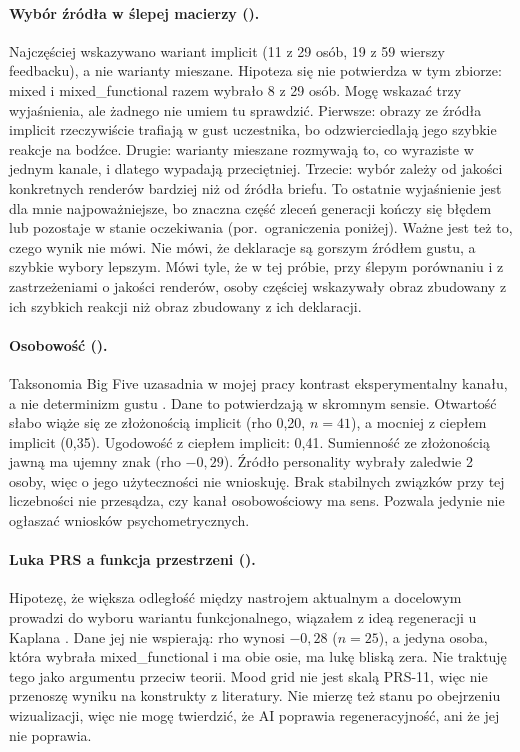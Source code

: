 \paragraph{Wybór źródła w ślepej macierzy ().}
Najczęściej wskazywano wariant implicit (11 z 29 osób, 19 z 59 wierszy feedbacku), a nie warianty mieszane. Hipoteza  się nie potwierdza w tym zbiorze: mixed i mixed\_functional razem wybrało 8 z 29 osób.
Mogę wskazać trzy wyjaśnienia, ale żadnego nie umiem tu sprawdzić. Pierwsze: obrazy ze źródła implicit rzeczywiście trafiają w gust uczestnika, bo odzwierciedlają jego szybkie reakcje na bodźce. Drugie: warianty mieszane rozmywają to, co wyraziste w jednym kanale, i dlatego wypadają przeciętniej. Trzecie: wybór zależy od jakości konkretnych renderów bardziej niż od źródła briefu. To ostatnie wyjaśnienie jest dla mnie najpoważniejsze, bo znaczna część zleceń generacji kończy się błędem lub pozostaje w stanie oczekiwania (por.\ ograniczenia poniżej).
Ważne jest też to, czego wynik nie mówi. Nie mówi, że deklaracje są gorszym źródłem gustu, a szybkie wybory lepszym. Mówi tyle, że w tej próbie, przy ślepym porównaniu i z zastrzeżeniami o jakości renderów, osoby częściej wskazywały obraz zbudowany z ich szybkich reakcji niż obraz zbudowany z ich deklaracji.

\paragraph{Osobowość ().}
Taksonomia Big Five uzasadnia w mojej pracy kontrast eksperymentalny kanału, a nie determinizm gustu \parencite{john2008bigfive}. Dane to potwierdzają w skromnym sensie. Otwartość słabo wiąże się ze złożonością implicit (rho 0,20, $n=41$), a mocniej z ciepłem implicit (0,35). Ugodowość z ciepłem implicit: 0,41. Sumienność ze złożonością jawną ma ujemny znak (rho $-0{,}29$).
Źródło personality wybrały zaledwie 2 osoby, więc o jego użyteczności nie wnioskuję. Brak stabilnych związków przy tej liczebności nie przesądza, czy kanał osobowościowy ma sens. Pozwala jedynie nie ogłaszać wniosków psychometrycznych.

\paragraph{Luka PRS a funkcja przestrzeni ().}
Hipotezę, że większa odległość między nastrojem aktualnym a docelowym prowadzi do wyboru wariantu funkcjonalnego, wiązałem z ideą regeneracji u Kaplana \parencite{kaplan1995restorative}. Dane jej nie wspierają: rho wynosi $-0{,}28$ ($n=25$), a jedyna osoba, która wybrała mixed\_functional i ma obie osie, ma lukę bliską zera.
Nie traktuję tego jako argumentu przeciw teorii. Mood grid nie jest skalą PRS-11, więc nie przenoszę wyniku na konstrukty z literatury. Nie mierzę też stanu po obejrzeniu wizualizacji, więc nie mogę twierdzić, że AI poprawia regeneracyjność, ani że jej nie poprawia.

